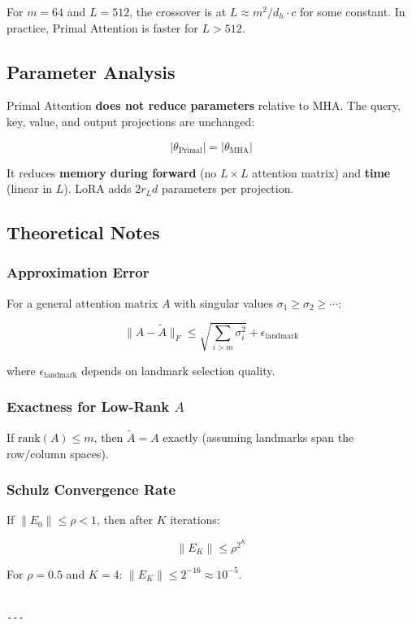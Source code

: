 For $m = 64$ and $L = 512$, the crossover is at $L \approx m^2 / d_h \cdot c$ 
for some constant. In practice, Primal Attention is faster for $L > 512$.

\subsection{Parameter Analysis}

Primal Attention \textbf{does not reduce parameters} relative to MHA. The query, 
key, value, and output projections are unchanged:

\[
|\theta_\text{Primal}| = |\theta_\text{MHA}|
\]

It reduces \textbf{memory during forward} (no $L \times L$ attention matrix) and 
\textbf{time} (linear in $L$). LoRA adds $2 r_L d$ parameters per projection.

\subsection{Theoretical Notes}

\subsubsection{Approximation Error}

For a general attention matrix $A$ with singular values $\sigma_1 \ge \sigma_2 \ge \cdots$:

\[
\|A - \tilde{A}\|_F \leq \sqrt{\sum_{i > m} \sigma_i^2} + \epsilon_\text{landmark}
\]

where $\epsilon_\text{landmark}$ depends on landmark selection quality.

\subsubsection{Exactness for Low-Rank $A$}

If $\text{rank}(A) \le m$, then $\tilde{A} = A$ exactly (assuming landmarks 
span the row/column spaces).

\subsubsection{Schulz Convergence Rate}

If $\|E_0\| \le \rho < 1$, then after $K$ iterations:

\[
\|E_K\| \le \rho^{2^K}
\]

For $\rho = 0.5$ and $K = 4$: $\|E_K\| \le 2^{-16} \approx 10^{-5}$.
\begin{lstlisting}

---
\end{lstlisting}


